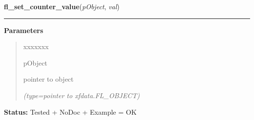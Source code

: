     \label{xformslib:library:fl_set_counter_value}

    \vspace{0.5ex}

\hspace{.8\funcindent}\begin{boxedminipage}{\funcwidth}

    \raggedright \textbf{fl\_set\_counter\_value}(\textit{pObject}, \textit{val})

    \vspace{-1.5ex}

    \rule{\textwidth}{0.5\fboxrule}
\setlength{\parskip}{2ex}
\setlength{\parskip}{1ex}
      \textbf{Parameters}
      \vspace{-1ex}

      \begin{quote}
        \begin{Ventry}{xxxxxxx}

          \item[pObject]

          pointer to object

            {\it (type=pointer to xfdata.FL\_OBJECT)}

        \end{Ventry}

      \end{quote}

\textbf{Status:} Tested + NoDoc + Example = OK



    \end{boxedminipage}

    \label{xformslib:library:fl_set_counter_bounds}

    \vspace{0.5ex}

